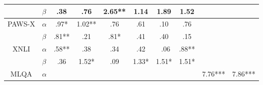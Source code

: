 {{\begin{tabular}{llcc|cc|cc|cc}
    \multicolumn{1}{c}{}                         & $\beta$   & \multicolumn{1}{c|}{\cellcolor{purple} .38}     & \multicolumn{1}{c|}{\cellcolor{purple} .76}    & \multicolumn{1}{c|}{\cellcolor{yellow} 2.65**}    & \multicolumn{1}{c|}{\cellcolor{yellow} 1.14}   & \multicolumn{1}{c|}{\cellcolor{yellow} 1.89}  & \multicolumn{1}{c|}{\cellcolor{purple} 1.52}   & \multicolumn{1}{c|}{\cellcolor{llight-gray}}     & \multicolumn{1}{c}{\cellcolor{llight-gray}}     \\ \hline
    \multicolumn{1}{c}{\multirow{2}{*}{PAWS-X}}  & $\alpha$  & \multicolumn{1}{c|}{\cellcolor{yellow} .97*}    & \multicolumn{1}{c|}{\cellcolor{purple} 1.02**} & \multicolumn{1}{c|}{\cellcolor{yellow} .76}       & \multicolumn{1}{c|}{\cellcolor{purple} .61}    & \multicolumn{1}{c|}{\cellcolor{purple} .10}   & \multicolumn{1}{c|}{\cellcolor{purple} .76}    & \multicolumn{1}{c|}{\cellcolor{llight-gray}}     & \multicolumn{1}{c}{\cellcolor{llight-gray}}     \\
    \multicolumn{1}{c}{}                         & $\beta$   & \multicolumn{1}{c|}{\cellcolor{yellow} .81**}   & \multicolumn{1}{c|}{\cellcolor{yellow} .21}    & \multicolumn{1}{c|}{\cellcolor{yellow} .81*}      & \multicolumn{1}{c|}{\cellcolor{yellow} .41}    & \multicolumn{1}{c|}{\cellcolor{purple} .40}   & \multicolumn{1}{c|}{\cellcolor{purple} .15}    & \multicolumn{1}{c|}{\cellcolor{llight-gray}}     & \multicolumn{1}{c}{\cellcolor{llight-gray}}     \\ \cline{3-10}
    \multicolumn{1}{c}{\multirow{2}{*}{XNLI}}    & $\alpha$  & \multicolumn{1}{c|}{\cellcolor{yellow} .58**}   & \multicolumn{1}{c|}{\cellcolor{yellow} .38}    & \multicolumn{1}{c|}{\cellcolor{yellow} .34}       & \multicolumn{1}{c|}{\cellcolor{yellow} .42}    & \multicolumn{1}{c|}{\cellcolor{yellow} .06}   & \multicolumn{1}{c|}{\cellcolor{yellow} .88**}  & \multicolumn{1}{c|}{\cellcolor{llight-gray}}     & \multicolumn{1}{c}{\cellcolor{llight-gray}}     \\
    \multicolumn{1}{c}{}                         & $\beta$   & \multicolumn{1}{c|}{\cellcolor{yellow} .36}     & \multicolumn{1}{c|}{\cellcolor{purple} 1.52*}  & \multicolumn{1}{c|}{\cellcolor{yellow} .09}       & \multicolumn{1}{c|}{\cellcolor{yellow} 1.33*}  & \multicolumn{1}{c|}{\cellcolor{yellow} 1.51*} & \multicolumn{1}{c|}{\cellcolor{purple} 1.51*}  & \multicolumn{1}{c|}{\cellcolor{llight-gray}}     & \multicolumn{1}{c}{\cellcolor{llight-gray}}     \\ \hline
    \multicolumn{1}{c}{\multirow{2}{*}{MLQA}}    & $\alpha$  & \multicolumn{1}{c|}{\cellcolor{llight-gray}}    & \multicolumn{1}{c|}{\cellcolor{llight-gray}}   & \multicolumn{1}{c|}{\cellcolor{llight-gray}}      & \multicolumn{1}{c|}{\cellcolor{llight-gray}}   & \multicolumn{1}{c|}{\cellcolor{llight-gray}}  & \multicolumn{1}{c|}{\cellcolor{llight-gray}}   & \multicolumn{1}{c|}{\cellcolor{yellow} 7.76***}  & \multicolumn{1}{c}{\cellcolor{yellow} 7.86***}  \\

\end{tabular}}}
